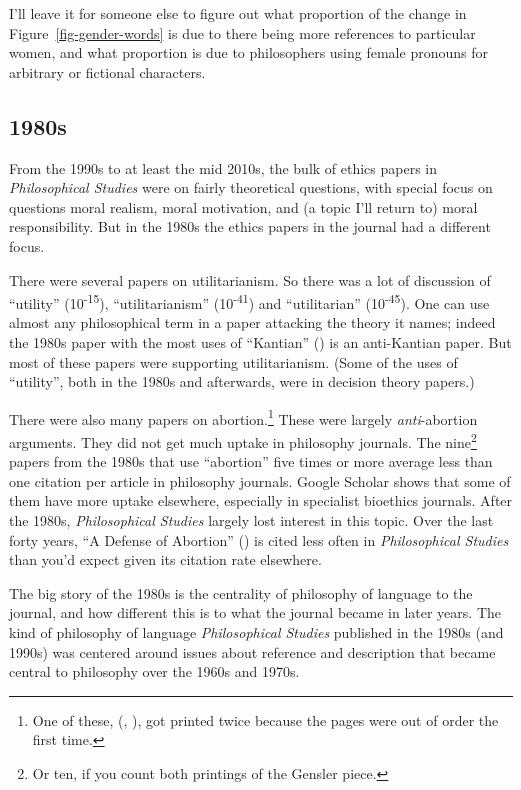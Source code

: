 \documentclass[
  10pt,
  letterpaper,
  DIV=11,
  numbers=noendperiod,
  twoside]{scrartcl}
\begin{document}
I'll leave it for someone else to figure out what proportion of the
change in Figure~\ref{fig-gender-words} is due to there being more
references to particular women, and what proportion is due to
philosophers using female pronouns for arbitrary or fictional
characters.

\subsection{1980s}\label{sec-1980s-articles}

From the 1990s to at least the mid 2010s, the bulk of ethics papers in
\emph{Philosophical Studies} were on fairly theoretical questions, with
special focus on questions moral realism, moral motivation, and (a topic
I'll return to) moral responsibility. But in the 1980s the ethics papers
in the journal had a different focus.

There were several papers on utilitarianism. So there was a lot of
discussion of ``utility'' (10\textsuperscript{-15}), ``utilitarianism''
(10\textsuperscript{-41}) and ``utilitarian'' (10\textsuperscript{-45}).
One can use almost any philosophical term in a paper attacking the
theory it names; indeed the 1980s paper with the most uses of
``Kantian'' () is an
anti-Kantian paper. But most of these papers were supporting
utilitarianism. (Some of the uses of ``utility'', both in the 1980s and
afterwards, were in decision theory papers.)

There were also many papers on abortion.\footnote{One of these,
  (,
  ), got printed twice because
  the pages were out of order the first time.} These were largely
\emph{anti}-abortion arguments. They did not get much uptake in
philosophy journals. The nine\footnote{Or ten, if you count both
  printings of the Gensler piece.} papers from the 1980s that use
``abortion'' five times or more average less than one citation per
article in philosophy journals. Google Scholar shows that some of them
have more uptake elsewhere, especially in specialist bioethics journals.
After the 1980s, \emph{Philosophical Studies} largely lost interest in
this topic. Over the last forty years, ``A Defense of Abortion''
() is cited less often in
\emph{Philosophical Studies} than you'd expect given its citation rate
elsewhere.

The big story of the 1980s is the centrality of philosophy of language
to the journal, and how different this is to what the journal became in
later years. The kind of philosophy of language \emph{Philosophical
Studies} published in the 1980s (and 1990s) was centered around issues
about reference and description that became central to philosophy over
the 1960s and 1970s.
\end{document}
